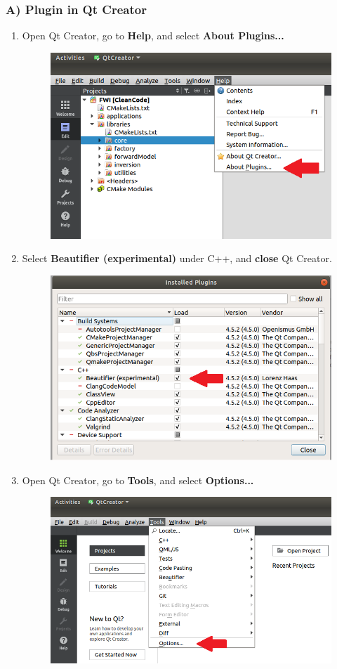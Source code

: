 \documentclass[10pt]{article}
\begin{document}
\subsubsection*{A) Plugin in Qt Creator}
\begin{enumerate}
\item Open Qt Creator, go to \textbf{Help}, and select \textbf{About Plugins...}
\begin{figure}[h!]
\centering
\includegraphics[width=0.6 \textwidth]{clang-format1.png}
\end{figure}

\newpage

\item Select \textbf{Beautifier (experimental)} under C++, and \textbf{close} Qt Creator.
\begin{figure}[h]
\centering
\includegraphics[width=0.6 \textwidth]{clang-format2.png}
\end{figure}

\item Open Qt Creator, go to \textbf{Tools}, and select \textbf{Options...}
\begin{figure}[h!]
\centering
\includegraphics[width=0.6 \textwidth]{clang-format3.png}
\end{figure}


\end{enumerate}
\end{document}

